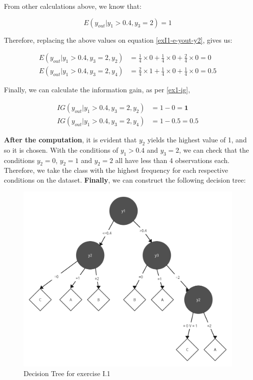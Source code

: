 \documentclass[12pt]{article}
\begin{document}
\begin{enumerate}[leftmargin=\labelsep]
    From other calculations above, we know that:

    \[
        E(y_{out} | y_1 > 0.4 , y_3 = 2) = 1
    \]

    Therefore, replacing the above values on equation \eqref{exI1-e-yout-y2}, gives us:

    \[
        \begin{aligned}
            E(y_{out} | y_1>0.4, y_3 = 2, y_2) & = \frac{1}{4} \times 0 + \frac{1}{4} \times 0 + \frac{2}{4} \times 0 = 0 \\
            E(y_{out} | y_1>0.4, y_3 = 2, y_4) & = \frac{2}{4} \times 1 + \frac{1}{4} \times 0 + \frac{1}{4} \times 0 = 0.5
        \end{aligned}
    \]

    Finally, we can calculate the information gain, as per \eqref{ex1-ig},

    \[
        \begin{aligned}
            IG(y_{out} |y_1 > 0.4, y_3 = 2, y_{2}) & = 1 - 0 = \textbf{1} \\
            IG(y_{out} |y_1 > 0.4, y_3 = 2, y_{4}) & = 1 - 0.5 = 0.5
        \end{aligned}
    \]

    \textbf{After the computation}, it is evident that $y_2$ yields the highest value of 1, and so it is chosen. With the conditions of $y_1 > 0.4$ and $y_3 = 2$, we
    can check that the conditions $y_2 = 0$, $y_2 = 1$ and $y_2 = 2$ all have less than 4 observations each. Therefore, we take the class with the highest frequency
    for each respective conditions on the dataset. \textbf{Finally}, we can construct the following decision tree:

    \begin{figure}[H]
        \centering
        \includegraphics[width=12cm]{./assets/decision_tree_ex1_PartI.png}
        \caption{Decision Tree for exercise I.1}
        \label{fig:decision_tree}
    \end{figure}


\end{enumerate}
\end{document}
